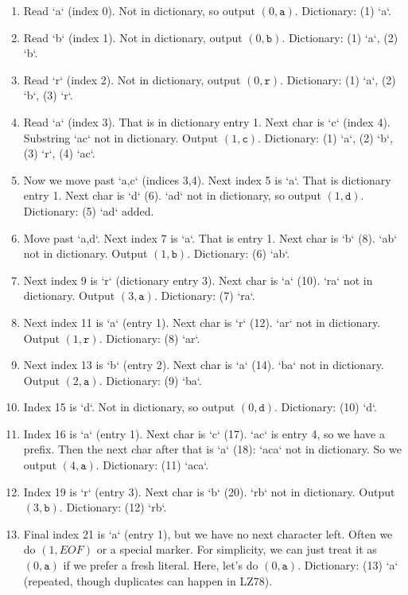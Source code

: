 \documentclass{article}
\begin{document}
\begin{enumerate}
\item Read `a` (index 0). Not in dictionary, so output $(0,\texttt{a})$. Dictionary: (1) `a`.
\item Read `b` (index 1). Not in dictionary, output $(0,\texttt{b})$. Dictionary: (1) `a`, (2) `b`.
\item Read `r` (index 2). Not in dictionary, output $(0,\texttt{r})$. Dictionary: (1) `a`, (2) `b`, (3) `r`.
\item Read `a` (index 3). That is in dictionary entry 1. Next char is `c` (index 4). Substring `ac` not in dictionary. Output $(1,\texttt{c})$. Dictionary: (1) `a`, (2) `b`, (3) `r`, (4) `ac`.
\item Now we move past `a,c` (indices 3,4). Next index 5 is `a`. That is dictionary entry 1. Next char is `d` (6). `ad` not in dictionary, so output $(1,\texttt{d})$. 
  Dictionary: (5) `ad` added.
\item Move past `a,d`. Next index 7 is `a`. That is entry 1. Next char is `b` (8). `ab` not in dictionary. Output $(1,\texttt{b})$. Dictionary: (6) `ab`.
\item Next index 9 is `r` (dictionary entry 3). Next char is `a` (10). `ra` not in dictionary. Output $(3,\texttt{a})$. Dictionary: (7) `ra`.
\item Next index 11 is `a` (entry 1). Next char is `r` (12). `ar` not in dictionary. Output $(1,\texttt{r})$. Dictionary: (8) `ar`.
\item Next index 13 is `b` (entry 2). Next char is `a` (14). `ba` not in dictionary. Output $(2,\texttt{a})$. Dictionary: (9) `ba`.
\item Index 15 is `d`. Not in dictionary, so output $(0,\texttt{d})$. Dictionary: (10) `d`.
\item Index 16 is `a` (entry 1). Next char is `c` (17). `ac` is entry 4, so we have a prefix. Then the next char after that is `a` (18): `aca` not in dictionary. So we output $(4,\texttt{a})$. Dictionary: (11) `aca`.
\item Index 19 is `r` (entry 3). Next char is `b` (20). `rb` not in dictionary. Output $(3,\texttt{b})$. Dictionary: (12) `rb`.
\item Final index 21 is `a` (entry 1), but we have no next character left. Often we do $(1,\textit{EOF})$ or a special marker. For simplicity, we can just treat it as $(0,\texttt{a})$ if we prefer a fresh literal. Here, let's do $(0,\texttt{a})$. Dictionary: (13) `a` (repeated, though duplicates can happen in LZ78).
\end{enumerate}
\end{document}

